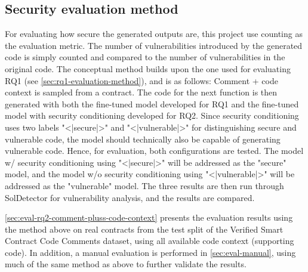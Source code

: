 \subsection{Security evaluation method}
\label{sec:rq2-evaluation-method}
For evaluating how secure the generated outputs are, this project use counting as the evaluation metric. The number of vulnerabilities introduced by the generated code is simply counted and compared to the number of vulnerabilities in the original code. The conceptual method builds upon the one used for evaluating RQ1 (see \cref{sec:rq1-evaluation-method}), and is as follows:
Comment + code context is sampled from a contract. The code for the next function is then generated with both the fine-tuned model developed for RQ1 and the fine-tuned model with security conditioning developed for RQ2. Since security conditioning uses two labels "<|secure|>" and "<|vulnerable|>" for distinguishing secure and vulnerable code, the model should technically also be capable of generating vulnerable code. Hence, for evaluation, both configurations are tested. The model w/ security conditioning using "<|secure|>" will be addressed as the "secure" model, and the model w/o security conditioning using "<|vulnerable|>" will be addressed as the "vulnerable" model. The three results are then run through SolDetector \cite{soldetector} for vulnerability analysis, and the results are compared.

\cref{sec:eval-rq2-comment-pluss-code-context} presents the evaluation results using the method above on real contracts from the test split of the Verified Smart Contract Code Comments dataset, using all available code context (supporting code). In addition, a manual evaluation is performed in \cref{sec:eval-manual}, using much of the same method as above to further validate the results.

